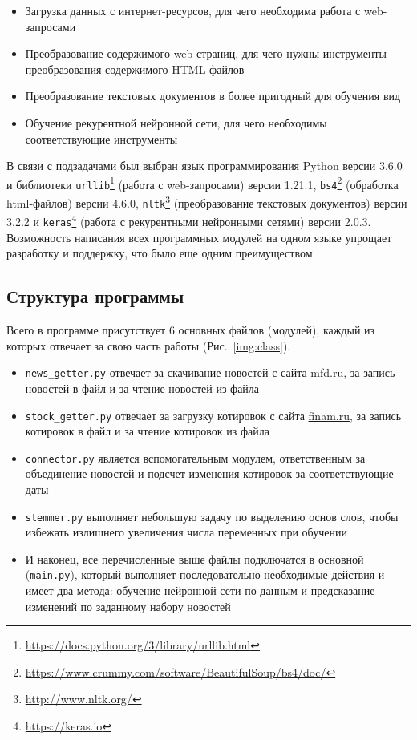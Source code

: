 \documentclass[14pt]{matmex-diploma-custom}
\begin{document}
\begin{itemize}
\item Загрузка данных с интернет-ресурсов, для чего необходима работа с web-запросами
\item Преобразование содержимого web-страниц, для чего нужны инструменты преобразования содержимого HTML-файлов
\item Преобразование текстовых документов в более пригодный для обучения вид
\item Обучение рекурентной нейронной сети, для чего необходимы соответствующие инструменты
\end{itemize}

В связи с подзадачами был выбран язык программирования Python версии 3.6.0 и библиотеки \texttt{urllib}\footnote{\url{https://docs.python.org/3/library/urllib.html}} (работа с web-запросами) версии 1.21.1, \texttt{bs4}\footnote{\url{https://www.crummy.com/software/BeautifulSoup/bs4/doc/}} (обработка html-файлов) версии 4.6.0, \texttt{nltk}\footnote{\url{http://www.nltk.org/}}\cite{tools:nltk} (преобразование текстовых документов) версии 3.2.2 и \texttt{keras}\footnote{\url{https://keras.io}}\cite{tools:keras} (работа с рекурентными нейронными сетями) версии 2.0.3. Возможность написания всех программных модулей на одном языке упрощает разработку и поддержку, что было еще одним преимуществом.

\subsection{Структура программы}

Всего в программе присутствует 6 основных файлов (модулей), каждый из которых отвечает за свою часть работы (Рис.~\ref{img:class}).

\begin{itemize}
\item \texttt{news\_getter.py} отвечает за скачивание новостей с сайта \url{mfd.ru}, за запись новостей в файл и за чтение новостей из файла
\item \texttt{stock\_getter.py} отвечает за загрузку котировок с сайта \url{finam.ru}, за запись котировок в файл и за чтение котировок из файла
\item \texttt{connector.py} является вспомогательным модулем, ответственным за объединение новостей и подсчет изменения котировок за соответствующие даты
\item \texttt{stemmer.py} выполняет небольшую задачу по выделению основ слов, чтобы избежать излишнего увеличения числа переменных при обучении
\item И наконец, все перечисленные выше файлы подключатся в основной (\texttt{main.py}), который выполняет последовательно необходимые действия и имеет два метода: обучение нейронной сети по данным и предсказание изменений по заданному набору новостей
\end{itemize}
\end{document}
